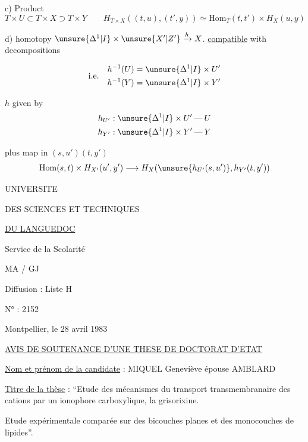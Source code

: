 c) Product
\[
T\times U\subset T\times X\supset T\times Y\qquad
H_{T\times X}((t,u),(t',y))\simeq\mathrm{Hom}_T(t,t')\times H_X(u,y)
\]

\hrulefill

d) homotopy $\unsure{\Delta^1|I}\times\unsure{X'|Z'}\xrightarrow{h}X$. \uline{compatible} with decompositions

\[
\text{i.e.}\quad\begin{aligned}
h^{-1}(U)&=\unsure{\Delta^1|I}\times U'\\
h^{-1}(Y)&=\unsure{\Delta^1|I}\times Y'
\end{aligned}
\]

$h$ given by
\[
\begin{aligned}
h_{U'}&:\unsure{\Delta^1|I}\times U'\mathbin{\text{---}}U\\
h_{Y'}&:\unsure{\Delta^1|I}\times Y'\mathbin{\text{---}}Y
\end{aligned}
\]

plus  map in $(s,u')(t,y')$
\[
\mathrm{Hom}(s,t)\times H_{X'}(u',y')\longrightarrow
H_X(\unsure{h_{U'}(s,u')},h_{Y'}(t,y'))
\]

\begin{center}
UNIVERSITE

DES SCIENCES ET TECHNIQUES

\uline{DU LANGUEDOC}
\end{center}

Service de la Scolarité

MA / GJ

Diffusion : Liste H

N° : 2152

Montpellier, le 28 avril 1983

\uline{AVIS DE SOUTENANCE D'UNE THESE DE DOCTORAT D'ETAT}

\uline{Nom et prénom de la candidate} : MIQUEL Geneviève épouse AMBLARD

\uline{Titre de la thèse} : ``Etude des mécanismes du transport transmembranaire des cations par un ionophore carboxylique, la grisorixine.

Etude expérimentale comparée sur des bicouches planes et des monocouches de lipides''.

